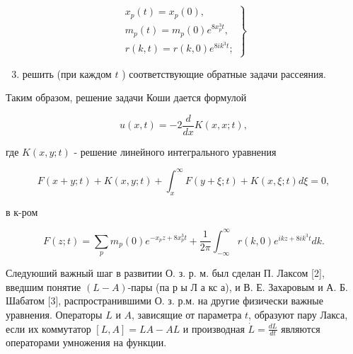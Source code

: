 \documentclass[10pt]{article}
\begin{document}
\[

\left.\begin{array}{l}

x_{p}(t)=x_{p}(0), \\

m_{p}(t)=m_{p}(0) e^{8 x_{p}^{3} t}, \\

r(k, t)=r(k, 0) e^{8 i k^{3} t} ;

\end{array}\right\}

\]



\begin{enumerate}

  \setcounter{enumi}{2}

  \item решить (при каждом $t$ ) соответствующие обратные задачи рассеяния.

\end{enumerate}



Таким образом, решение задачи Коши дается формулой



\[

u(x, t)=-2 \frac{d}{d x} K(x, x ; t),

\]



где $K(x, y ; t)$ - решение линейного интегрального уравнения



\[

F(x+y ; t)+K(x, y ; t)+\int_{x}^{\infty} F(y+\xi ; t)+K(x, \xi ; t) d \xi=0,

\]



в к-ром



\[

F(z ; t)=\sum_{p} m_{p}(0) e^{-x_{p} z+8 x_{p}^{3} t}+\frac{1}{2 \pi} \int_{-\infty}^{\infty} r(k, 0) e^{i k z+8 i k^{3} t} d k .

\]



Следуюший важный шаг в развитии О. з. р. м. был сделан П. Лаксом [2], введшим понятие $(L-A)$-пары (па р ы Л а кс а), и В. Е. Захаровым и А. Б. Шабатом [3], распространившими О. з. р.м. на другие физически важные уравнения. Операторы $L$ и $A$, зависящие от параметра $t$, образуют пару Лакса, если их коммутатор $[L, A]=L A-A L$ и производная $\dot{L}=\frac{d L}{d t}$ являются операторами умножения на функции.
\end{document}
